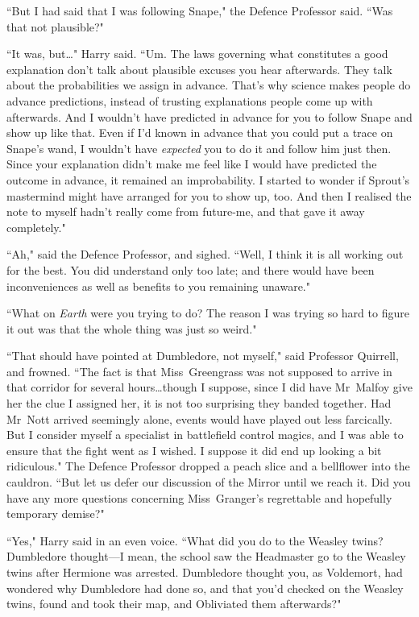 ``But I had said that I was following Snape," the Defence Professor said. ``Was that not plausible?"

``It was, but…" Harry said. ``Um. The laws governing what constitutes a good explanation don't talk about plausible excuses you hear afterwards. They talk about the probabilities we assign in advance. That's why science makes people do advance predictions, instead of trusting explanations people come up with afterwards. And I wouldn't have predicted in advance for you to follow Snape and show up like that. Even if I'd known in advance that you could put a trace on Snape's wand, I wouldn't have \emph{expected} you to do it and follow him just then. Since your explanation didn't make me feel like I would have predicted the outcome in advance, it remained an improbability. I started to wonder if Sprout's mastermind might have arranged for you to show up, too. And then I realised the note to myself hadn't really come from future-me, and that gave it away completely."

``Ah," said the Defence Professor, and sighed. ``Well, I think it is all working out for the best. You did understand only too late; and there would have been inconveniences as well as benefits to you remaining unaware."

``What on \emph{Earth} were you trying to do? The reason I was trying so hard to figure it out was that the whole thing was just so weird."

``That should have pointed at Dumbledore, not myself," said Professor Quirrell, and frowned. ``The fact is that Miss~Greengrass was not supposed to arrive in that corridor for several hours…though I suppose, since I did have Mr~Malfoy give her the clue I assigned her, it is not too surprising they banded together. Had Mr~Nott arrived seemingly alone, events would have played out less farcically. But I consider myself a specialist in battlefield control magics, and I was able to ensure that the fight went as I wished. I suppose it did end up looking a bit ridiculous." The Defence Professor dropped a peach slice and a bellflower into the cauldron. ``But let us defer our discussion of the Mirror until we reach it. Did you have any more questions concerning Miss~Granger's regrettable and hopefully temporary demise?"

``Yes," Harry said in an even voice. ``What did you do to the Weasley twins? Dumbledore thought—I mean, the school saw the Headmaster go to the Weasley twins after Hermione was arrested. Dumbledore thought you, as Voldemort, had wondered why Dumbledore had done so, and that you'd checked on the Weasley twins, found and took their map, and Obliviated them afterwards?"


